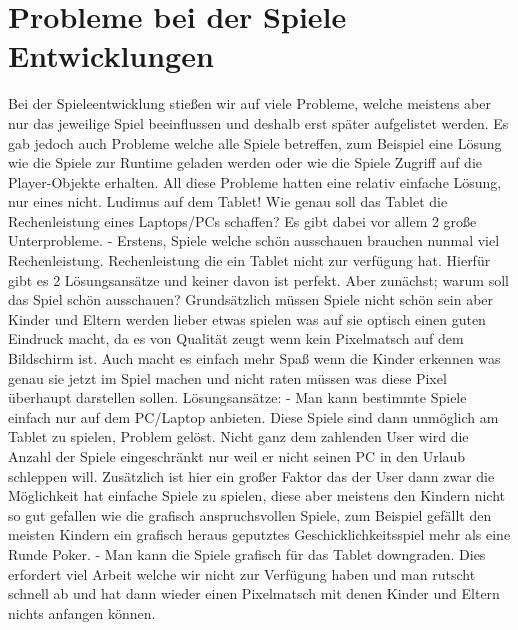 \section{Probleme bei der Spiele Entwicklungen}
Bei der Spieleentwicklung stießen wir auf viele Probleme, welche meistens aber nur das jeweilige Spiel beeinflussen und deshalb erst später aufgelistet werden. Es gab jedoch auch Probleme welche alle Spiele betreffen, zum Beispiel eine Lösung wie die Spiele zur Runtime geladen werden oder wie die Spiele Zugriff auf die Player-Objekte erhalten. All diese Probleme hatten eine relativ einfache Lösung, nur eines nicht. Ludimus auf dem Tablet! Wie genau soll das Tablet die Rechenleistung eines Laptops/PCs schaffen? Es gibt dabei vor allem 2 große Unterprobleme.
\newline \newline \tab 
- Erstens, Spiele welche schön ausschauen brauchen nunmal viel Rechenleistung. Rechenleistung die ein Tablet nicht zur verfügung hat. Hierfür gibt es 2 Lösungsansätze und keiner davon ist perfekt. Aber zunächst; warum soll das Spiel schön ausschauen? Grundsätzlich müssen Spiele nicht schön sein aber Kinder und Eltern werden lieber etwas spielen was auf sie optisch einen guten Eindruck macht, da es von Qualität zeugt wenn kein Pixelmatsch auf dem Bildschirm ist. Auch macht es einfach mehr Spaß wenn die Kinder erkennen was genau sie jetzt im Spiel machen und nicht raten müssen was diese Pixel überhaupt darstellen sollen. Lösungsansätze:
\newline \newline \tab \tab 
- Man kann bestimmte Spiele einfach nur auf dem PC/Laptop anbieten. Diese Spiele sind dann unmöglich am Tablet zu spielen, Problem gelöst. Nicht ganz dem zahlenden User wird die Anzahl der Spiele eingeschränkt nur weil er nicht seinen PC in den Urlaub schleppen will. Zusätzlich ist hier ein großer Faktor das der User dann zwar die Möglichkeit hat einfache Spiele zu spielen, diese aber meistens den Kindern nicht so gut gefallen wie die grafisch anspruchsvollen Spiele, zum Beispiel gefällt den meisten Kindern ein grafisch heraus geputztes Geschicklichkeitsspiel mehr als eine Runde Poker.
\newline \newline \tab \tab 
- Man kann die Spiele grafisch für das Tablet downgraden. Dies erfordert viel Arbeit welche wir nicht zur Verfügung haben und man rutscht schnell ab und hat dann wieder einen Pixelmatsch mit denen Kinder und Eltern nichts anfangen können.
\newline \newline 
